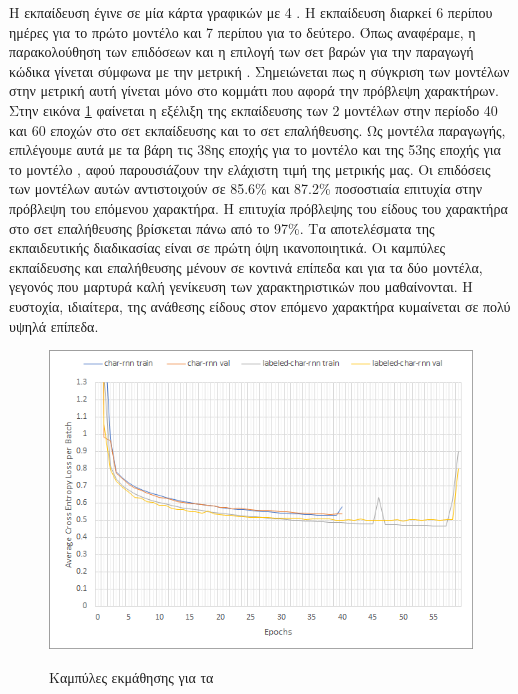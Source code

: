 Η εκπαίδευση έγινε σε μία κάρτα γραφικών  με 4 .
Η εκπαίδευση διαρκεί 6 περίπου ημέρες για το πρώτο μοντέλο και 7 περίπου για το δεύτερο.
Όπως αναφέραμε, η παρακολούθηση των επιδόσεων και η επιλογή των σετ βαρών για την παραγωγή κώδικα γίνεται σύμφωνα με την μετρική .
Σημειώνεται πως η σύγκριση των μοντέλων στην μετρική αυτή γίνεται μόνο στο κομμάτι που αφορά την πρόβλεψη χαρακτήρων.
Στην εικόνα \ref{training1} φαίνεται η εξέλιξη της εκπαίδευσης των 2 μοντέλων στην περίοδο 40 και 60 εποχών στο σετ εκπαίδευσης και το σετ επαλήθευσης. 
Ως μοντέλα παραγωγής, επιλέγουμε αυτά με τα βάρη τις 38ης εποχής για το μοντέλο  και της 53ης εποχής για το μοντέλο , αφού παρουσιάζουν την ελάχιστη τιμή της μετρικής μας.
Οι επιδόσεις των μοντέλων αυτών αντιστοιχούν σε 85.6\% και 87.2\% ποσοστιαία επιτυχία στην πρόβλεψη του επόμενου χαρακτήρα.
Η επιτυχία πρόβλεψης του είδους του χαρακτήρα στο σετ επαλήθευσης βρίσκεται πάνω από το 97\%.
Τα αποτελέσματα της εκπαιδευτικής διαδικασίας είναι σε πρώτη όψη ικανοποιητικά. Οι καμπύλες εκπαίδευσης και επαλήθευσης μένουν σε κοντινά επίπεδα και για τα δύο μοντέλα, γεγονός που μαρτυρά καλή γενίκευση των χαρακτηριστικών που μαθαίνονται. Η ευστοχία, ιδιαίτερα, της ανάθεσης είδους στον επόμενο χαρακτήρα κυμαίνεται σε πολύ υψηλά επίπεδα. 

\begin{figure}[h]
	\caption{Καμπύλες εκμάθησης για τα }
	\includegraphics[trim = 2 2 2 2, clip, keepaspectratio]{images/training1.png}
	\centering
	\label{training1}
\end{figure}

